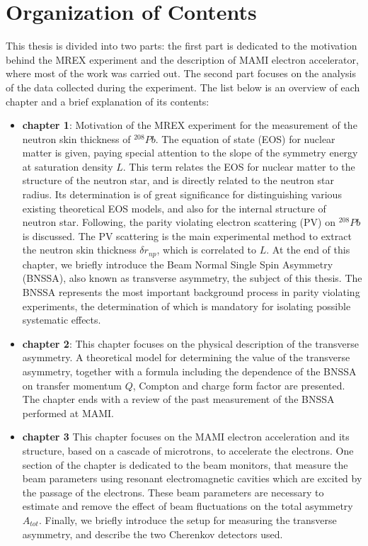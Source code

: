 \chapter*{Organization of Contents}

This thesis is divided into two parts: the first part is dedicated to the motivation behind the MREX experiment and the description of MAMI electron accelerator, where most of the work was carried out. The second part focuses on the analysis of the data collected during the experiment. The list below is an overview of each chapter and a brief explanation of its contents:

\begin{itemize}
\item \textbf{chapter 1}: Motivation of the MREX experiment for the measurement of the neutron skin thickness of $^{208}Pb$. The equation of state (EOS) for nuclear matter is given, paying special attention to the slope of the symmetry energy at saturation density $L$. This term relates the EOS for nuclear matter to the structure of the neutron star, and is directly related to the neutron star radius. Its determination is of great significance for distinguishing various existing theoretical EOS models, and also for the internal structure of neutron star. Following, the parity violating electron scattering (PV) on $^{208}Pb$ is discussed. The PV scattering is the main experimental method to extract the neutron skin thickness $\delta r_{np}$, which is correlated to $L$. At the end of this chapter, we briefly introduce the Beam Normal Single Spin Asymmetry (BNSSA), also known as transverse asymmetry, the subject of this thesis. The BNSSA represents the most important background process in parity violating experiments, the determination of which is mandatory for isolating possible systematic effects. 
\item \textbf{chapter 2}: This chapter focuses on the physical description of the transverse asymmetry. A theoretical model for determining the value of the transverse asymmetry, together with a formula including the dependence of the BNSSA on transfer momentum $Q$, Compton and charge form factor are presented. The chapter ends with a review of the past measurement of the BNSSA performed at MAMI.  
\item \textbf{chapter 3} This chapter focuses on the MAMI electron acceleration and its structure, based on a cascade of microtrons, to accelerate the electrons. One section of the chapter is dedicated to the beam monitors, that measure the beam parameters using resonant electromagnetic cavities which are excited by the passage of the electrons. These beam parameters are necessary to estimate and remove the effect of beam fluctuations on the total asymmetry $A_{tot}$. Finally, we briefly introduce  the setup for measuring the transverse asymmetry, and describe the two Cherenkov detectors used.

\end{itemize}
